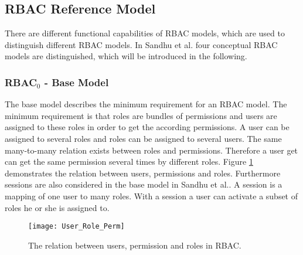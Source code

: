     \subsection{RBAC Reference Model}
    \label{sec:rbacmodels}
    There are different functional capabilities of RBAC models, which are used to distinguish different RBAC models. In Sandhu et al.\cite{Sandhu:1996} four conceptual RBAC models are distinguished, which will be introduced in the following.
        \subsubsection{RBAC$_0$ - Base Model}
            The base model describes the minimum requirement for an RBAC model. The minimum requirement is that roles are bundles of permissions and users are assigned to these roles in order to get the according permissions. A user can be assigned to several roles and roles can be assigned to several users. The same many-to-many relation exists between roles and permissions. Therefore a user get can get the same permission several times by different roles. Figure \ref{fig:basicRBAC} demonstrates the relation between users, permissions and roles. Furthermore sessions are also considered in the base model in Sandhu et al.\cite{Sandhu:1996}. A session is a mapping of one user to many roles. With a session a user can activate a subset of roles he or she is assigned to.
            \begin{figure}[H]
                \centering
                \texttt{[image: User\_Role\_Perm]}
                \caption{The relation between users, permission and roles in RBAC.}
                \label{fig:basicRBAC}
            \end{figure}
            

